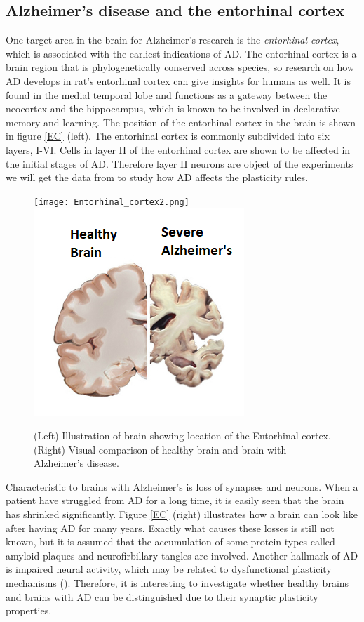\subsection{Alzheimer's disease and the entorhinal cortex}
\label{EandA}

One target area in the brain for Alzheimer's research is the \textit{entorhinal cortex}, which is associated with the earliest indications of AD. The entorhinal cortex is a brain region that is phylogenetically conserved across species, so research on how AD develops in rat's entorhinal cortex can give insights for humans as well. It is found in the medial temporal lobe and functions as a gateway between the neocortex and the hippocampus, which is known to be involved in declarative memory and learning. The position  of the entorhinal cortex in the brain is shown in figure \ref{EC} (left). The entorhinal cortex is commonly subdivided into six layers, I-VI. Cells in layer II of the entorhinal cortex are shown to be affected in the initial stages of AD. Therefore layer II neurons are object of the experiments we will get the data from to study how AD affects the plasticity rules.

\begin{figure}[h]
    \caption{(Left) Illustration of brain showing location of the Entorhinal cortex. (Right) Visual comparison of healthy brain and brain with Alzheimer's disease.}
    \label{EC}
    \centering
    \texttt{[image: Entorhinal\_cortex2.png]}
    \includegraphics[scale=0.8]{fig/Alzheimers_picture.png}    
    \label{brain}
\end{figure} 

Characteristic to brains with Alzheimer's is loss of synapses and neurons. When a patient have struggled from AD for a long time, it is easily seen that the brain has shrinked significantly. Figure \ref{EC} (right) illustrates how a brain can look like after having AD for many years. Exactly what causes these losses is still not known, but it is assumed that the accumulation of some protein types called amyloid plaques and neurofirbillary tangles are involved. Another hallmark of AD is impaired neural activity, which may be related to dysfunctional plasticity mechanisms (\cite{Zott}). Therefore, it is interesting to investigate whether healthy brains and brains with AD can be distinguished due to their synaptic plasticity properties.


